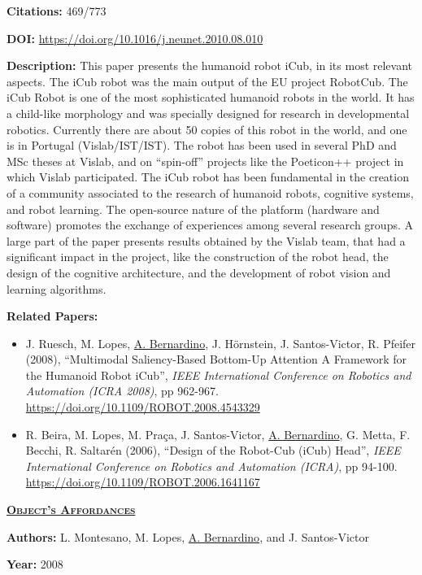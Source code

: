\textbf{Citations:} 469/773

\textbf{DOI:} \url{https://doi.org/10.1016/j.neunet.2010.08.010}

\textbf{Description:} This paper presents the humanoid robot iCub, in
its most relevant aspects. The iCub robot was the main output of the EU
project RobotCub. The iCub Robot is one of the most sophisticated
humanoid robots in the world. It has a child-like morphology and was
specially designed for research in developmental robotics. Currently
there are about 50 copies of this robot in the world, and one is in
Portugal (Vislab/IST/IST). The robot has been used in several PhD and
MSc theses at Vislab, and on ``spin-off'' projects like the Poeticon++
project in which Vislab participated. The iCub robot has been
fundamental in the creation of a community associated to the research of
humanoid robots, cognitive systems, and robot learning. The open-source
nature of the platform (hardware and software) promotes the exchange of
experiences among several research groups. A large part of the paper
presents results obtained by the Vislab team, that had a significant
impact in the project, like the construction of the robot head, the
design of the cognitive architecture, and the development of robot
vision and learning algorithms.

\textbf{Related Papers:}

\begin{itemize}
\item
  J. Ruesch, M. Lopes, \ul{A. Bernardino}, J. Hörnstein, J.
  Santos-Victor, R. Pfeifer (2008), ``Multimodal Saliency-Based
  Bottom-Up Attention A Framework for the Humanoid Robot iCub'',
  \emph{IEEE International Conference on Robotics and Automation (ICRA
  2008)}, pp 962-967. \url{https://doi.org/10.1109/ROBOT.2008.4543329}
\item
  R. Beira, M. Lopes, M. Praça, J. Santos-Victor, \ul{A. Bernardino}, G.
  Metta, F. Becchi, R. Saltarén (2006), ``Design of the Robot-Cub (iCub)
  Head'', \emph{IEEE International Conference on Robotics and Automation
  (ICRA)}, pp 94-100. \url{https://doi.org/10.1109/ROBOT.2006.1641167}
\end{itemize}

\clearpage

\textbf{\textsc{\ul{Object's Affordances}}}

\textbf{Authors:} L. Montesano, M. Lopes, \ul{A. Bernardino}, and J.
Santos-Victor

\textbf{Year:} 2008


